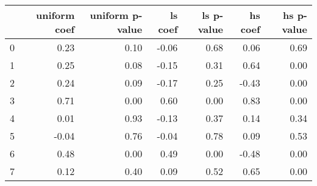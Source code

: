 \begin{tabular}{lrrrrrr}
\toprule
 & uniform coef & uniform p-value & ls coef & ls p-value & hs coef & hs p-value \\
\midrule
0 & 0.23 & 0.10 & -0.06 & 0.68 & 0.06 & 0.69 \\
1 & 0.25 & 0.08 & -0.15 & 0.31 & 0.64 & 0.00 \\
2 & 0.24 & 0.09 & -0.17 & 0.25 & -0.43 & 0.00 \\
3 & 0.71 & 0.00 & 0.60 & 0.00 & 0.83 & 0.00 \\
4 & 0.01 & 0.93 & -0.13 & 0.37 & 0.14 & 0.34 \\
5 & -0.04 & 0.76 & -0.04 & 0.78 & 0.09 & 0.53 \\
6 & 0.48 & 0.00 & 0.49 & 0.00 & -0.48 & 0.00 \\
7 & 0.12 & 0.40 & 0.09 & 0.52 & 0.65 & 0.00 \\
\bottomrule
\end{tabular}

